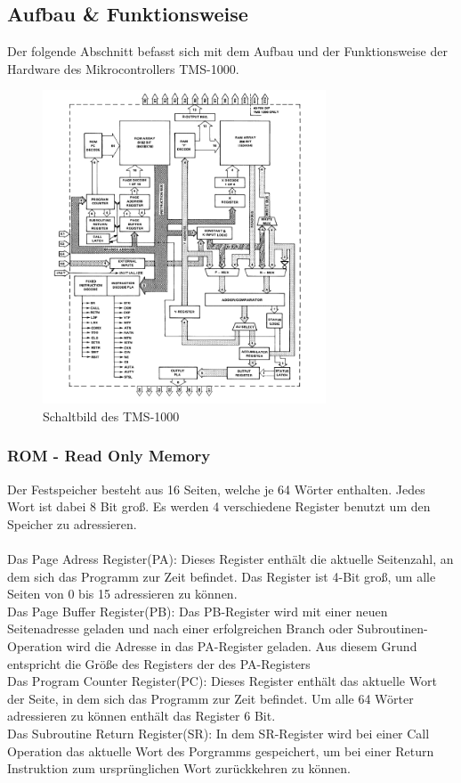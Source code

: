 \subsection{Aufbau \& Funktionsweise}

Der folgende Abschnitt befasst sich mit dem Aufbau und der Funktionsweise der Hardware des Mikrocontrollers TMS-1000. 

\begin{figure}[!htb]
	\centering
		\includegraphics[width=0.75\textwidth]{figures/schaltbild.PNG}
	\caption{Schaltbild des TMS-1000}
	\label{fig:schaltbild}
\end{figure}

\subsubsection{ROM - Read Only Memory}

Der Festspeicher besteht aus 16 Seiten, welche je 64 W{\"o}rter enthalten. Jedes Wort ist dabei 8 Bit gro{\ss}. Es werden 4 verschiedene Register benutzt um den Speicher zu adressieren. \\
\\
Das Page Adress Register(PA): Dieses Register enth{\"a}lt die aktuelle Seitenzahl, an dem sich das Programm zur Zeit befindet. Das Register ist 4-Bit gro{\ss}, um alle Seiten von 0 bis 15 adressieren zu k{\"o}nnen. \\
Das Page Buffer Register(PB): Das PB-Register wird mit einer neuen Seitenadresse geladen und nach einer erfolgreichen Branch oder Subroutinen-Operation wird die Adresse in das PA-Register geladen. Aus diesem Grund entspricht die Gr{\"o}{\ss}e des Registers der des PA-Registers \\
Das Program Counter Register(PC): Dieses Register enth{\"a}lt das aktuelle Wort der Seite, in dem sich das Programm zur Zeit befindet. Um alle 64 W{\"o}rter adressieren zu k{\"o}nnen enth{\"a}lt das Register 6 Bit. \\
Das Subroutine Return Register(SR): In dem SR-Register wird bei einer Call Operation das aktuelle Wort des Porgramms gespeichert, um bei einer Return Instruktion zum urspr{\"u}nglichen Wort zur{\"u}ckkehren zu k{\"o}nnen. 

